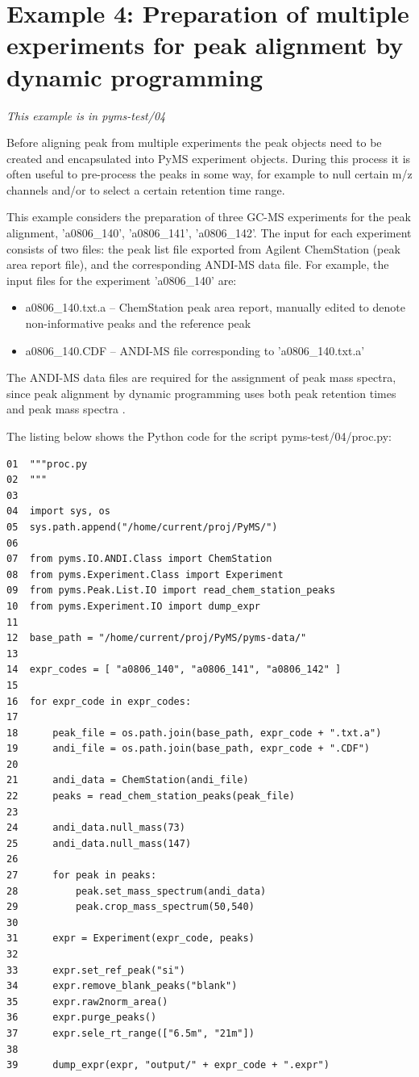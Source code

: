 \section{Example 4: Preparation of multiple experiments for peak alignment
by dynamic programming}

\noindent
{\em This example is in pyms-test/04}

Before aligning peak from multiple experiments the peak objects need to be
created and encapsulated into PyMS experiment objects. During this process
it is often useful to pre-process the peaks in some way, for example to
null certain m/z channels and/or to select a certain retention time range.

This example considers the preparation of three GC-MS experiments for
the peak alignment, 'a0806\_140', 'a0806\_141', 'a0806\_142'. The input
for each experiment consists of two files: the peak list file exported
from Agilent ChemStation (peak area report file), and the corresponding
ANDI-MS data file. For example, the input files for the experiment
'a0806\_140' are:

\begin{itemize}
\item a0806\_140.txt.a -- ChemStation peak area report, manually edited
to denote non-informative peaks and the reference peak
\item a0806\_140.CDF -- ANDI-MS file corresponding to 'a0806\_140.txt.a'
\end{itemize}

The ANDI-MS data files are required for the assignment of peak mass spectra,
since peak alignment by dynamic programming uses both peak retention times
and peak mass spectra \cite{Robinson07}.

The listing below shows the Python code for the script pyms-test/04/proc.py:

\begin{verbatim}
01  """proc.py
02  """
03  
04  import sys, os
05  sys.path.append("/home/current/proj/PyMS/")
06  
07  from pyms.IO.ANDI.Class import ChemStation
08  from pyms.Experiment.Class import Experiment
09  from pyms.Peak.List.IO import read_chem_station_peaks
10  from pyms.Experiment.IO import dump_expr
11  
12  base_path = "/home/current/proj/PyMS/pyms-data/"
13  
14  expr_codes = [ "a0806_140", "a0806_141", "a0806_142" ]
15  
16  for expr_code in expr_codes:
17  
18      peak_file = os.path.join(base_path, expr_code + ".txt.a")
19      andi_file = os.path.join(base_path, expr_code + ".CDF")
20  
21      andi_data = ChemStation(andi_file)
22      peaks = read_chem_station_peaks(peak_file)
23  
24      andi_data.null_mass(73)
25      andi_data.null_mass(147)
26  
27      for peak in peaks:
28          peak.set_mass_spectrum(andi_data)
29          peak.crop_mass_spectrum(50,540)
30  
31      expr = Experiment(expr_code, peaks)
32  
33      expr.set_ref_peak("si")
34      expr.remove_blank_peaks("blank")
35      expr.raw2norm_area()
36      expr.purge_peaks()
37      expr.sele_rt_range(["6.5m", "21m"])
38  
39      dump_expr(expr, "output/" + expr_code + ".expr")
\end{verbatim}

